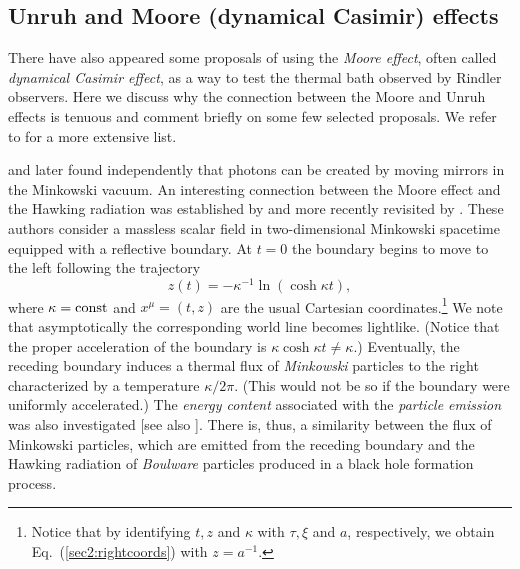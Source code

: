 \documentclass[12pt,nofootinbib,floatfix,aps,prd,showpacs,amsmath,amssymb,eqsecnum]{revtex4-2}
\let\cite\citep
\begin{document}
\subsection{Unruh and Moore (dynamical Casimir) effects}
\label{subsection:dynamicalcasimir}

There have also appeared some proposals of using the {\em Moore effect}, 
often called
{\em dynamical Casimir effect}, as a way to test the thermal 
bath observed by Rindler observers. Here we discuss why the connection 
between the Moore and Unruh effects is tenuous and comment briefly on some 
few selected proposals. We refer to \textcite{Rosu01} for a more 
extensive list.

\textcite{Moore70} and later \textcite{DeWitt75} found independently 
that photons can be created by 
moving mirrors in the Minkowski vacuum. An interesting connection 
between the Moore effect and the Hawking radiation was established 
by \textcite{Daviesetal77} and more recently revisited  by 
\textcite{Calogeracos02b,Calogeracos02}. These authors consider a 
massless scalar field in two-dimensional Minkowski spacetime equipped 
with a reflective boundary. At $t=0$ the boundary begins to move to 
the left following the trajectory
\begin{equation}
z(t) = - \kappa^{-1} \ln (\cosh \kappa t),
\end{equation}
where $\kappa = {\rm const}$ and $x^\mu= (t,z)$ are the usual Cartesian 
coordinates.\footnote{Notice that by identifying $t, z$ and $\kappa$
with $\tau, \xi$ and $a$, respectively, we obtain Eq.~(\ref{sec2:rightcoords})
with $z=a^{-1}$.} We note that asymptotically the corresponding world line 
becomes lightlike. (Notice that the proper acceleration of the boundary
is $\kappa \cosh \kappa t \neq \kappa$.) Eventually, the 
receding boundary induces a thermal flux of {\em Minkowski} particles 
to the right characterized by a temperature $\kappa/2 \pi$. 
(This would not be so if the boundary were uniformly 
accelerated.) The {\em energy content} associated 
with the {\em particle emission} was also investigated  
\cite{Fullingetal76} [see also \textcite{Calogeracos04}]. 
There is,  thus, a similarity between the flux of Minkowski particles, 
which are emitted from the receding boundary and the Hawking 
radiation of {\em Boulware} particles produced in a black hole 
formation process. 
\end{document}
